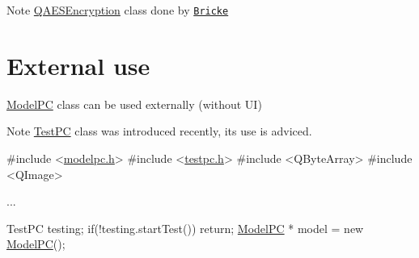 \begin{DoxyNote}{Note}
\mbox{\hyperlink{class_q_a_e_s_encryption}{Q\+A\+E\+S\+Encryption}} class done by \href{https://github.com/bricke}{\tt Bricke}
\end{DoxyNote}
\hypertarget{index_ext-use}{}\section{External use}\label{index_ext-use}
\mbox{\hyperlink{class_model_p_c}{Model\+PC}} class can be used externally (without UI) \begin{DoxyNote}{Note}
\mbox{\hyperlink{class_test_p_c}{Test\+PC}} class was introduced recently, its use is adviced. 
\begin{DoxyCode}
\textcolor{preprocessor}{#include <\mbox{\hyperlink{modelpc_8h}{modelpc.h}}>}
\textcolor{preprocessor}{#include <\mbox{\hyperlink{testpc_8h}{testpc.h}}>}
\textcolor{preprocessor}{#include <QByteArray>}
\textcolor{preprocessor}{#include <QImage>}

...

TestPC testing;
\textcolor{keywordflow}{if}(!testing.startTest())
    \textcolor{keywordflow}{return};
\mbox{\hyperlink{class_model_p_c}{ModelPC}} * model = \textcolor{keyword}{new} \mbox{\hyperlink{class_model_p_c}{ModelPC}}();


\end{DoxyCode}
\end{DoxyNote}

